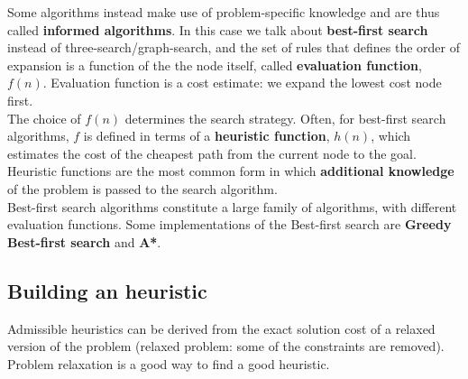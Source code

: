 \documentclass{article}
\begin{document}
Some algorithms instead make use of problem-specific knowledge and are thus called \textbf{informed algorithms}. In this case we talk about \textbf{best-first search} instead of three-search/graph-search, and the set of rules that defines the order of expansion is a function of the the node itself, called \textbf{evaluation function}, $f(n)$. Evaluation function is a cost estimate: we expand the lowest cost node
first. \\

The choice of $f(n)$ determines the search strategy. Often, for best-first search algorithms, $f$ is defined in terms of a \textbf{heuristic function}, $h(n)$, which estimates the cost of the cheapest path from the current node to the goal. Heuristic functions are the most common form in which \textbf{additional knowledge} of the problem is passed to the search algorithm. \\

Best-first search algorithms constitute a large family of algorithms, with different evaluation functions. Some implementations of the Best-first search are \textbf{Greedy Best-first search} and \textbf{A*}.

\subsection{Building an heuristic}

Admissible heuristics can be derived from the exact solution cost of a relaxed version of the problem (relaxed problem: some of the constraints are removed). Problem relaxation is a good way to find a good heuristic. \\

\newpage

\begin{figure}[h!]
    \centering
\end{figure}
\end{document}
